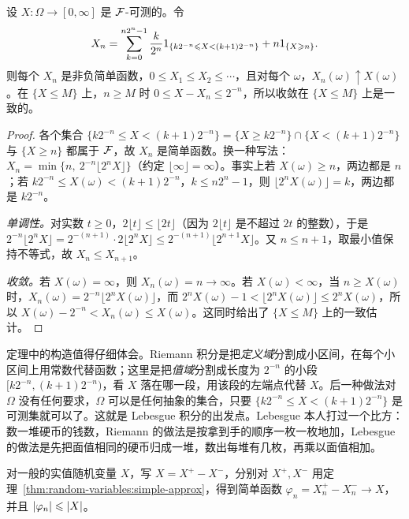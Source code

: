\begin{theorem}[简单函数逼近]\label{thm:random-variables:simple-approx}
设 $X:\Omega\to[0,\infty]$ 是 $\mathcal{F}$-可测的。令
\[
X_n=\sum_{k=0}^{n2^n-1}\frac{k}{2^n}1_{\{k2^{-n}\leqslant X<(k+1)2^{-n}\}}+n1_{\{X\geqslant n\}}.
\]
则每个 $X_n$ 是非负简单函数，$0\leqslant X_1\leqslant X_2\leqslant\cdots$，且对每个 $\omega$，$X_n(\omega)\uparrow X(\omega)$。在 $\{X\leqslant M\}$ 上，$n\geqslant M$ 时 $0\leqslant X-X_n\leqslant2^{-n}$，所以收敛在 $\{X\leqslant M\}$ 上是一致的。
\end{theorem}
\begin{proof}
各个集合 $\{k2^{-n}\leqslant X<(k+1)2^{-n}\}=\{X\geqslant k2^{-n}\}\cap\{X<(k+1)2^{-n}\}$ 与 $\{X\geqslant n\}$ 都属于 $\mathcal{F}$，故 $X_n$ 是简单函数。换一种写法：$X_n=\min\{n,\ 2^{-n}\lfloor2^nX\rfloor\}$（约定 $\lfloor\infty\rfloor=\infty$）。事实上若 $X(\omega)\geqslant n$，两边都是 $n$；若 $k2^{-n}\leqslant X(\omega)<(k+1)2^{-n}$，$k\leqslant n2^n-1$，则 $\lfloor2^nX(\omega)\rfloor=k$，两边都是 $k2^{-n}$。

\emph{单调性。}对实数 $t\geqslant0$，$2\lfloor t\rfloor\leqslant\lfloor2t\rfloor$（因为 $2\lfloor t\rfloor$ 是不超过 $2t$ 的整数），于是 $2^{-n}\lfloor2^nX\rfloor=2^{-(n+1)}\cdot2\lfloor2^nX\rfloor\leqslant2^{-(n+1)}\lfloor2^{n+1}X\rfloor$。又 $n\leqslant n+1$，取最小值保持不等式，故 $X_n\leqslant X_{n+1}$。

\emph{收敛。}若 $X(\omega)=\infty$，则 $X_n(\omega)=n\to\infty$。若 $X(\omega)<\infty$，当 $n\geqslant X(\omega)$ 时，$X_n(\omega)=2^{-n}\lfloor2^nX(\omega)\rfloor$，而 $2^nX(\omega)-1<\lfloor2^nX(\omega)\rfloor\leqslant2^nX(\omega)$，所以 $X(\omega)-2^{-n}<X_n(\omega)\leqslant X(\omega)$。这同时给出了 $\{X\leqslant M\}$ 上的一致估计。
\end{proof}

\begin{remark}[分割值域]
定理中的构造值得仔细体会。Riemann 积分是把\emph{定义域}分割成小区间，在每个小区间上用常数代替函数；这里是把\emph{值域}分割成长度为 $2^{-n}$ 的小段 $[k2^{-n},(k+1)2^{-n})$，看 $X$ 落在哪一段，用该段的左端点代替 $X$。后一种做法对 $\Omega$ 没有任何要求，$\Omega$ 可以是任何抽象的集合，只要 $\{k2^{-n}\leqslant X<(k+1)2^{-n}\}$ 是可测集就可以了。这就是 Lebesgue 积分的出发点。Lebesgue 本人打过一个比方：数一堆硬币的钱数，Riemann 的做法是按拿到手的顺序一枚一枚地加，Lebesgue 的做法是先把面值相同的硬币归成一堆，数出每堆有几枚，再乘以面值相加。
\end{remark}

对一般的实值随机变量 $X$，写 $X=X^+-X^-$，分别对 $X^+,X^-$ 用定理~\ref{thm:random-variables:simple-approx}，得到简单函数 $\varphi_n=X_n^+-X_n^-\to X$，并且 $\lvert \varphi_n\rvert\leqslant\lvert X\rvert$。

